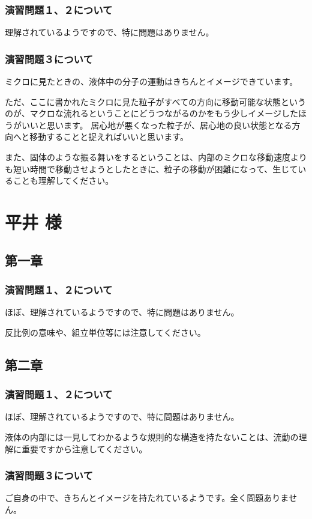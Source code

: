 \documentclass[uplatex,dvipdfmx,a4paper,11pt]{jsreport}
\begin{document}
\subsubsection*{演習問題１、２について}
理解されているようですので、特に問題はありません。

\subsubsection*{演習問題３について}

ミクロに見たときの、液体中の分子の運動はきちんとイメージできています。

ただ、ここに書かれたミクロに見た粒子がすべての方向に移動可能な状態というのが、マクロな流れるということにどうつながるのかをもう少しイメージしたほうがいいと思います。
居心地が悪くなった粒子が、居心地の良い状態となる方向へと移動することと捉えればいいと思います。

また、固体のような振る舞いをするということは、内部のミクロな移動速度よりも短い時間で移動させようとしたときに、粒子の移動が困難になって、生じていることも理解してください。



\clearpage
\section*{平井 様}
\subsection*{第一章}
\subsubsection*{演習問題１、２について}
ほぼ、理解されているようですので、特に問題はありません。

反比例の意味や、組立単位等には注意してください。

\subsection*{第二章}
\subsubsection*{演習問題１、２について}
ほぼ、理解されているようですので、特に問題はありません。

液体の内部には一見してわかるような規則的な構造を持たないことは、流動の理解に重要ですから注意してください。


\subsubsection*{演習問題３について}

ご自身の中で、きちんとイメージを持たれているようです。全く問題ありません。


\clearpage
\end{document}

